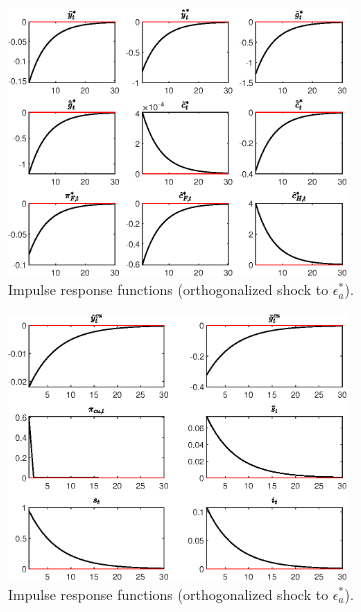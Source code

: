 \begin{figure}[H]
\centering 
\includegraphics[width=0.80\textwidth]{MODEL_MAIN_3/graphs/MODEL_MAIN_3_IRF_eps_a_starr2}
\caption{Impulse response functions (orthogonalized shock to ${\epsilon_a^*}$).}\label{Fig:IRF:eps_a_starr:2}
\end{figure}
 
\begin{figure}[H]
\centering 
\includegraphics[width=0.80\textwidth]{MODEL_MAIN_3/graphs/MODEL_MAIN_3_IRF_eps_a_starr3}
\caption{Impulse response functions (orthogonalized shock to ${\epsilon_a^*}$).}\label{Fig:IRF:eps_a_starr:3}
\end{figure}
 
 
